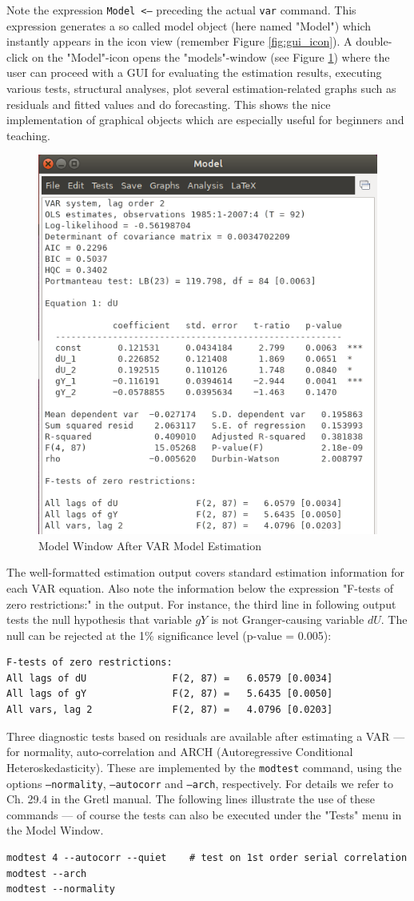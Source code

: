 \documentclass[11pt]{article}
\begin{document}
Note the expression \texttt{Model <--} preceding the actual \texttt{var} command. This expression generates a so called model object (here named "Model") which instantly appears in the icon view (remember Figure \ref{fig:gui_icon}). A double-click on the "Model"-icon opens the "models"-window (see Figure \ref{fig:gui_model}) where the user can proceed with a GUI for evaluating the estimation results, executing various tests, structural analyses, plot several estimation-related graphs such as residuals and fitted values and do forecasting. This shows the nice implementation of graphical objects which are especially useful for beginners and teaching.

\begin{figure}[!h]
	\centering
	\includegraphics[width=.42\textwidth]{../figures/gui_var}
	\caption{Model Window After VAR Model Estimation}
	\label{fig:gui_model}
\end{figure}

The well-formatted estimation output covers standard estimation information for each VAR equation. Also note the information below the expression "F-tests of zero restrictions:" in the output. For instance, the third line in following output tests the null hypothesis that variable $ gY $ is not Granger-causing variable $ dU $. The null can be rejected at the 1\% significance level (p-value = 0.005):
\begin{Verbatim}[baselinestretch=0.75, fontsize=\small]
F-tests of zero restrictions:
All lags of dU               F(2, 87) =   6.0579 [0.0034]
All lags of gY               F(2, 87) =   5.6435 [0.0050]
All vars, lag 2              F(2, 87) =   4.0796 [0.0203]
\end{Verbatim}

Three diagnostic tests based on residuals are available after estimating a VAR --- for normality, auto-correlation and ARCH (Autoregressive Conditional Heteroskedasticity). These are implemented by the \texttt{modtest} command, using the options \texttt{---normality}, \texttt{---autocorr} and \texttt{---arch}, respectively. For details we refer to Ch. 29.4 in the Gretl manual. The following lines illustrate the use of these commands --- of course the tests can also be executed under the "Tests" menu in the Model Window.
\begin{Verbatim}[baselinestretch=0.75, fontsize=\small]
modtest 4 --autocorr --quiet	# test on 1st order serial correlation
modtest --arch
modtest --normality
\end{Verbatim}
\end{document}
